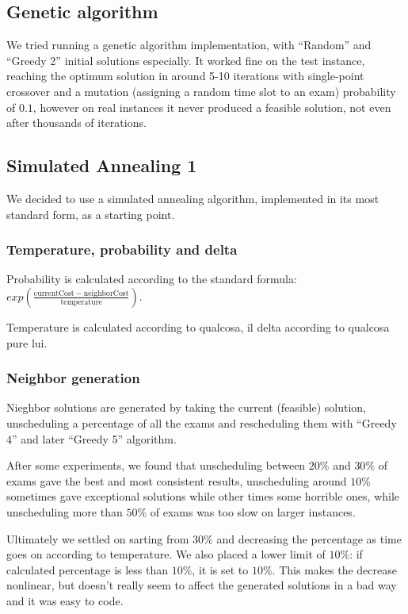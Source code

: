 \documentclass[11pt, a4paper, leqno]{article}
\begin{document}
	\subsection{Genetic algorithm}
	
	We tried running a genetic algorithm implementation, with ``Random'' and ``Greedy 2'' initial solutions especially. It worked fine on the test instance, reaching the optimum solution in around 5-10 iterations with single-point crossover and a mutation (assigning a random time slot to an exam) probability of $0.1$, however on real instances it never produced a feasible solution, not even after thousands of iterations.
	
	\subsection{Simulated Annealing 1}
	
	We decided to use a simulated annealing algorithm, implemented in its most standard form, as a starting point.
	
	\subsubsection{Temperature, probability and delta}
	
	Probability is calculated according to the standard formula: $exp\left(\frac{\mathrm{currentCost}-\mathrm{neighborCost}}{\mathrm{temperature}}\right)$.
	
	Temperature is calculated according to qualcosa, il delta according to qualcosa pure lui.
	
	\subsubsection{Neighbor generation}
	\label{neighbors}
	
	Nieghbor solutions are generated by taking the current (feasible) solution, unscheduling a percentage of all the exams and rescheduling them with ``Greedy 4'' and later ``Greedy 5'' algorithm.
	
	After some experiments, we found that unscheduling between $20\%$ and $30\%$ of exams gave the best and most consistent results, unscheduling around $10\%$ sometimes gave exceptional solutions while other times some horrible ones, while unscheduling more than $50\%$ of exams was too slow on larger instances.
	
	Ultimately we settled on sarting from $30\%$ and decreasing the percentage as time goes on according to temperature. We also placed a lower limit of $10\%$: if calculated percentage is less than $10\%$, it is set to $10\%$. This makes the decrease nonlinear, but doesn't really seem to affect the generated solutions in a bad way and it was easy to code.
	
\end{document}
